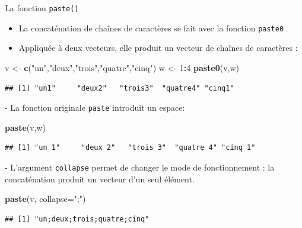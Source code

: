 \documentclass[
  ignorenonframetext,
]{beamer}
\newenvironment{Shaded}{\begin{snugshade}}{\end{snugshade}}
\newcommand{\AttributeTok}[1]{\textcolor[rgb]{0.13,0.29,0.53}{#1}}
\newcommand{\DecValTok}[1]{\textcolor[rgb]{0.00,0.00,0.81}{#1}}
\newcommand{\FunctionTok}[1]{\textcolor[rgb]{0.13,0.29,0.53}{\textbf{#1}}}
\newcommand{\NormalTok}[1]{#1}
\newcommand{\OtherTok}[1]{\textcolor[rgb]{0.56,0.35,0.01}{#1}}
\newcommand{\SpecialCharTok}[1]{\textcolor[rgb]{0.81,0.36,0.00}{\textbf{#1}}}
\newcommand{\StringTok}[1]{\textcolor[rgb]{0.31,0.60,0.02}{#1}}
\providecommand{\tightlist}{%
  \setlength{\itemsep}{0pt}\setlength{\parskip}{0pt}}
\begin{document}
\begin{frame}[fragile]{La fonction \texttt{paste()}}
\protect\hypertarget{la-fonction-paste}{}
\begin{itemize}
\tightlist
\item
  La concaténation de chaînes de caractères se fait avec la fonction
  \texttt{paste0}
\item
  Appliquée à deux vecteurs, elle produit un vecteur de chaînes de
  caractères :
\end{itemize}

\tiny

\begin{Shaded}
\begin{Highlighting}[]
\NormalTok{v }\OtherTok{\textless{}{-}} \FunctionTok{c}\NormalTok{(}\StringTok{"un"}\NormalTok{,}\StringTok{"deux"}\NormalTok{,}\StringTok{"trois"}\NormalTok{,}\StringTok{"quatre"}\NormalTok{,}\StringTok{"cinq"}\NormalTok{)}
\NormalTok{w }\OtherTok{\textless{}{-}} \DecValTok{1}\SpecialCharTok{:}\DecValTok{4}
\FunctionTok{paste0}\NormalTok{(v,w)}
\end{Highlighting}
\end{Shaded}

\begin{verbatim}
## [1] "un1"     "deux2"   "trois3"  "quatre4" "cinq1"
\end{verbatim}

\normalsize - La fonction originale \texttt{paste} introduit un espace:

\tiny

\begin{Shaded}
\begin{Highlighting}[]
\FunctionTok{paste}\NormalTok{(v,w)}
\end{Highlighting}
\end{Shaded}

\begin{verbatim}
## [1] "un 1"     "deux 2"   "trois 3"  "quatre 4" "cinq 1"
\end{verbatim}

\normalsize - L'argument \texttt{collapse} permet de changer le mode de
fonctionnement : la concaténation produit un vecteur d'un seul élément.

\tiny

\begin{Shaded}
\begin{Highlighting}[]
\FunctionTok{paste}\NormalTok{(v, }\AttributeTok{collapse=}\StringTok{";"}\NormalTok{)}
\end{Highlighting}
\end{Shaded}

\begin{verbatim}
## [1] "un;deux;trois;quatre;cinq"
\end{verbatim}

\normalsize
\end{frame}
\end{document}
